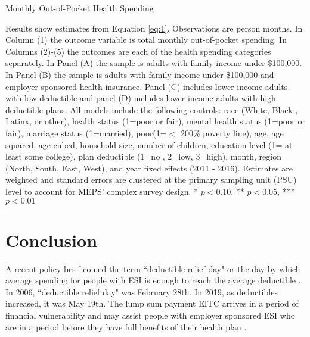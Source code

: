 \documentclass[smallcondensed,referee]{svjour3}
\makeatletter
\let\estinput=%
\newcommand{\estwide}[3]{
		\vspace{.75ex}{
			\begin{tabular*}
			{\textwidth}{@{\hskip\tabcolsep\extracolsep\fill}l*{#2}{#3}}
			\toprule
			\estinput{#1}
			\bottomrule
			\addlinespace[.75ex]
			\end{tabular*}
			}
		}
\makeatother
\begin{document}
\begin{table}[h!] \caption{Monthly Out-of-Pocket Health Spending} \label{table3}
	\begin{minipage}{15cm}
		\footnotesize

Results show estimates from Equation \ref{eq:1}. Observations are person months.  In Column (1) the outcome variable is total monthly out-of-pocket spending. In Columns (2)-(5) the outcomes are each of the health spending categories separately.  In Panel (A) the sample is adults with family income under \$100,000.
In Panel (B) the sample is adults with family income under \$100,000 and employer sponsored health insurance. Panel (C) includes lower income adults with low deductible and panel (D) includes lower income adults with high deductible plans. All models include the following controls:  race (White, Black , Latinx, or other), health status (1=poor or fair), mental health status (1=poor or fair), marriage status (1=married), poor(1=$<$ 200\% poverty line), age, age squared, age cubed, household size, number of children, education level (1= at least some college), plan deductible (1=no , 2=low, 3=high), month, region (North, South, East, West), and year fixed effects (2011 - 2016). Estimates are weighted and standard errors are clustered at the primary sampling unit (PSU) level to account for MEPS’ complex survey design. * $p<0.10$, ** $p<0.05$, ***$ p<0.01$
	\end{minipage}
\end{table}
















\section{Conclusion}

 A recent policy brief coined the term ``deductible relief day" or the day by which average spending for people with ESI is enough to reach the average deductible \citep{lee_deductible_2019}.   In 2006,  ``deductible relief day" was February 28th. In 2019, as deductibles increased, it was May 19th. The lump sum payment EITC arrives in a period of financial vulnerability and may assist people with employer sponsored ESI who are in a period before they have full benefits of their health plan \citep{lee_deductible_2019}.
\end{document}
